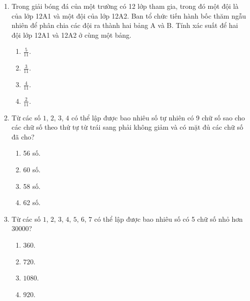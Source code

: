 \begin{enumerate}[label=\textbf{Câu \arabic*.},align=left,left=0cm..0cm,itemindent=*]
	\begin{multicols}{4}\begin{enumerate}[label=\textbf{\Alph*.},align=left,left=1cm..0cm,itemindent=*]
		\item $0,504$. \item $0,092$. \item $0,587$. \item $0,006$.
	\end{enumerate}\end{multicols}
	\item Trong giải bóng đá của một trường có 12 lớp tham gia, trong đó một đội là của lớp 12A1 và một đội của lớp 12A2. Ban tổ chức tiến hành bốc thăm ngẫu nhiên để phân chia các đội ra thành hai bảng A và B. Tính xác suất để hai đội lớp 12A1 và 12A2 ở cùng một bảng.
	\begin{multicols}{4}\begin{enumerate}[label=\textbf{\Alph*.},align=left,left=1cm..0cm,itemindent=*]
		\item $\frac{5}{11}$. \item $\frac{3}{11}$. \item $\frac{4}{11}$. \item $\frac{2}{11}$.
	\end{enumerate}\end{multicols}
	\item Từ các số $1$, $2$, $3$, $4$ có thể lập được bao nhiêu số tự nhiên có 9 chữ số sao cho các chữ số theo thứ tự từ trái sang phải không giảm và có mặt đủ các chữ số đã cho?
	\begin{multicols}{4}\begin{enumerate}[label=\textbf{\Alph*.},align=left,left=1cm..0cm,itemindent=*]
		\item 56 số. \item 60 số. \item 58 số. \item 62 số.
	\end{enumerate}\end{multicols}
	\item Từ các số $1$, $2$, $3$, $4$, $5$, $6$, $7$ có thể lập được bao nhiêu số có 5 chữ số nhỏ hơn $30000$?
	\begin{multicols}{4}\begin{enumerate}[label=\textbf{\Alph*.},align=left,left=1cm..0cm,itemindent=*]
		\item $360$. \item $720$. \item $1080$. \item $920$.

\end{enumerate}
\end{multicols}
\end{enumerate}
